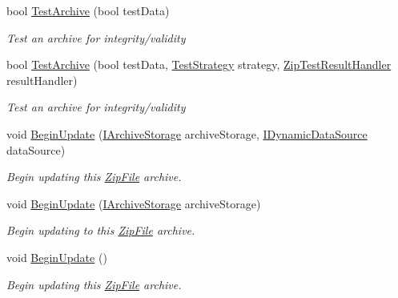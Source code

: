 \begin{DoxyCompactItemize}
bool \hyperlink{class_i_c_sharp_code_1_1_sharp_zip_lib_1_1_zip_1_1_zip_file_ad56b307a8abbf5d68330e0ffe0a0d007}{Test\+Archive} (bool test\+Data)
\begin{DoxyCompactList}\small\item\em Test an archive for integrity/validity \end{DoxyCompactList}\item 
bool \hyperlink{class_i_c_sharp_code_1_1_sharp_zip_lib_1_1_zip_1_1_zip_file_a8afce1b1400373bb6e6f88021ef80441}{Test\+Archive} (bool test\+Data, \hyperlink{namespace_i_c_sharp_code_1_1_sharp_zip_lib_1_1_zip_a3a2e6526ecaa7dbfa11576c6560ad5a5}{Test\+Strategy} strategy, \hyperlink{namespace_i_c_sharp_code_1_1_sharp_zip_lib_1_1_zip_a80ec37fb8220f68e710a9beff884a743}{Zip\+Test\+Result\+Handler} result\+Handler)
\begin{DoxyCompactList}\small\item\em Test an archive for integrity/validity \end{DoxyCompactList}\item 
void \hyperlink{class_i_c_sharp_code_1_1_sharp_zip_lib_1_1_zip_1_1_zip_file_aab12416623ac5e549a6827d312cb6251}{Begin\+Update} (\hyperlink{interface_i_c_sharp_code_1_1_sharp_zip_lib_1_1_zip_1_1_i_archive_storage}{I\+Archive\+Storage} archive\+Storage, \hyperlink{interface_i_c_sharp_code_1_1_sharp_zip_lib_1_1_zip_1_1_i_dynamic_data_source}{I\+Dynamic\+Data\+Source} data\+Source)
\begin{DoxyCompactList}\small\item\em Begin updating this \hyperlink{class_i_c_sharp_code_1_1_sharp_zip_lib_1_1_zip_1_1_zip_file}{Zip\+File} archive. \end{DoxyCompactList}\item 
void \hyperlink{class_i_c_sharp_code_1_1_sharp_zip_lib_1_1_zip_1_1_zip_file_a3e889f07213ddc9dfd9876875f017374}{Begin\+Update} (\hyperlink{interface_i_c_sharp_code_1_1_sharp_zip_lib_1_1_zip_1_1_i_archive_storage}{I\+Archive\+Storage} archive\+Storage)
\begin{DoxyCompactList}\small\item\em Begin updating to this \hyperlink{class_i_c_sharp_code_1_1_sharp_zip_lib_1_1_zip_1_1_zip_file}{Zip\+File} archive. \end{DoxyCompactList}\item 
void \hyperlink{class_i_c_sharp_code_1_1_sharp_zip_lib_1_1_zip_1_1_zip_file_a938dbbc553b0dc77b2c4914cec1da8a5}{Begin\+Update} ()
\begin{DoxyCompactList}\small\item\em Begin updating this \hyperlink{class_i_c_sharp_code_1_1_sharp_zip_lib_1_1_zip_1_1_zip_file}{Zip\+File} archive. \end{DoxyCompactList}\item 

\end{DoxyCompactItemize}
